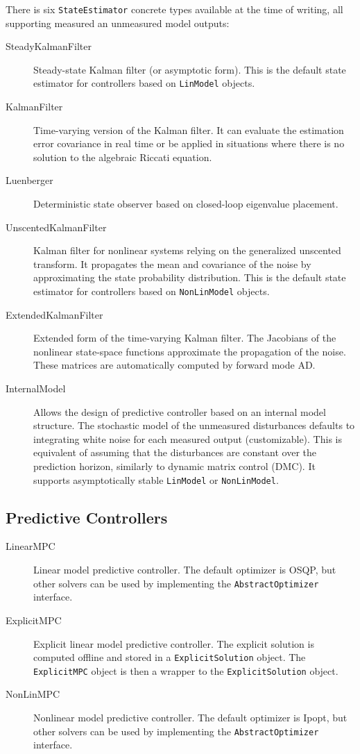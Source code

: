 There is six \texttt{StateEstimator} concrete types available at the time of writing, all supporting measured an unmeasured model outputs:
\begin{description}
    \item[SteadyKalmanFilter] Steady-state Kalman filter (or asymptotic form). This is the default state estimator for controllers based on \texttt{LinModel} objects.
    \item[KalmanFilter] Time-varying version of the Kalman filter. It can evaluate the estimation error covariance in real time or be applied in situations where there is no solution to the algebraic Riccati equation.
    \item[Luenberger] Deterministic state observer based on closed-loop eigenvalue placement.
    \item[UnscentedKalmanFilter] Kalman filter for nonlinear systems relying on the generalized unscented transform. It propagates the mean and covariance of the noise by approximating the state probability distribution. This is the default state estimator for controllers based on \texttt{NonLinModel} objects.
    \item[ExtendedKalmanFilter] Extended form of the time-varying Kalman filter. The Jacobians of the nonlinear state-space functions approximate the propagation of the noise. These matrices are automatically computed by forward mode AD.
    \item[InternalModel] Allows the design of predictive controller based on an internal model structure. The stochastic model of the unmeasured disturbances defaults to integrating white noise for each measured output (customizable). This is equivalent of assuming that the disturbances are constant over the prediction horizon, similarly to dynamic matrix control (DMC). It supports asymptotically stable \texttt{LinModel} or \texttt{NonLinModel}.
\end{description}

\subsection{Predictive Controllers}

\begin{description}
    \item[LinearMPC] Linear model predictive controller. The default optimizer is OSQP, but other solvers can be used by implementing the \texttt{AbstractOptimizer} interface.
    \item[ExplicitMPC] Explicit linear model predictive controller. The explicit solution is computed offline and stored in a \texttt{ExplicitSolution} object. The \texttt{ExplicitMPC} object is then a wrapper to the \texttt{ExplicitSolution} object.
    \item[NonLinMPC] Nonlinear model predictive controller. The default optimizer is Ipopt, but other solvers can be used by implementing the \texttt{AbstractOptimizer} interface. 
\end{description}

